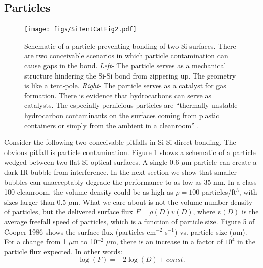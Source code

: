\documentclass[osajnl,preprint,showpacs,superscriptaddress,12pt]{revtex4-1} %
\begin{document}
\subsection{Particles}

\begin{figure}[htbp]
\centerline{\texttt{[image: figs/SiTentCatFig2.pdf]}}
\caption{Schematic of a particle preventing bonding of two Si surfaces\label{figParticle}.  There are two conceivable scenarios in which particle contamination can cause gaps in the bond.  \emph{Left-} The particle serves as a mechanical structure hindering the Si-Si bond from zippering up.  The geometry is like a tent-pole.  \emph{Right-} The particle serves as a catalyst for gas formation.  There is evidence that hydrocarbons can serve as catalysts.  The especially pernicious particles are ``thermally unstable hydrocarbon contaminants on the surfaces coming from plastic containers or simply from the ambient in a cleanroom'' \cite{1998AnRMS..28..215G}. }
\end{figure}

Consider the following two conceivable pitfalls in Si-Si direct bonding.  The obvious pitfall is particle contamination.  Figure \ref{figParticle} shows a schematic of a particle wedged between two flat Si optical surfaces.  A single 0.6 $\mu$m particle can create a dark IR bubble from interference.  In the next section we show that smaller bubbles can unacceptably degrade the performance to as low as 35 nm.  In a class 100 cleanroom, the volume density could be as high as $\rho=100$ particles/ft$^3$, with sizes larger than 0.5 $\mu$m.  What we care about is not the volume number density of particles, but the delivered surface flux $F=\rho(D) v(D)$, where $v(D)$ is the average freefall speed of particles, which is a function of particle size.  Figure 5 of Cooper 1986\cite{doi:10.1080/02786828608959094} shows the surface flux (particles cm$^{-2}$ s$^{-1}$) vs. particle size ($\mu$m).  For a change from 1 $\mu$m to 10$^{-2}$ $\mu$m, there is an increase in a factor of $10^4$ in the particle flux expected.  In other words:
$$\log(F) = -2\log(D) + const.$$
\end{document}
